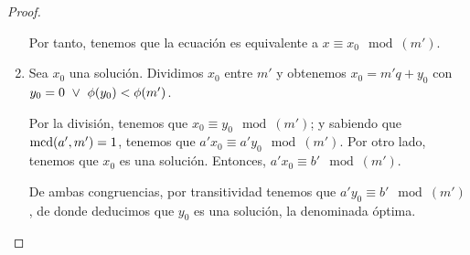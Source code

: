\begin{proof}
\begin{enumerate}
    Por tanto, tenemos que la ecuación es equivalente a $x\equiv x_0\mod(m')$.

    \item Sea $x_0$ una solución. Dividimos $x_0$ entre $m'$ y obtenemos $x_0=m'q+y_0$ con $y_0=0 \ \lor \  \phi(y_0)<\phi(m')$.

    Por la división, tenemos que $x_0\equiv y_0\mod(m')$; y sabiendo que $\operatorname{mcd}(a', m')=1$, tenemos que $a'x_0\equiv a'y_0 \mod(m')$. Por otro lado, tenemos que $x_0$ es una solución. Entonces, $a'x_0\equiv b'\mod(m')$.
    
    De ambas congruencias, por transitividad tenemos que $a'y_0\equiv b'\mod(m')$, de donde deducimos que $y_0$ es una solución, la denominada óptima.    
\end{enumerate}
\end{proof}

